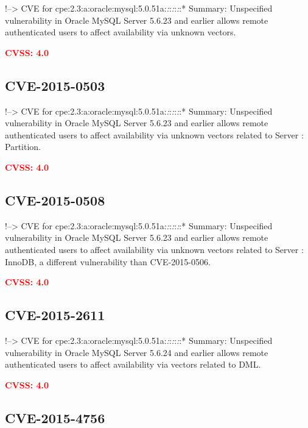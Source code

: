 \documentclass[a4paper, 12pt]{article}
\begin{document}
!--\textgreater{} CVE for
cpe:2.3:a:oracle:mysql:5.0.51a:\emph{:}:\emph{:}:\emph{:}:* Summary:
Unspecified vulnerability in Oracle MySQL Server 5.6.23 and earlier
allows remote authenticated users to affect availability via unknown
vectors.

\textbf{\textcolor{red}{CVSS: 4.0}}

\hypertarget{cve-2015-0503}{%
\subsection{CVE-2015-0503}\label{cve-2015-0503}}

!--\textgreater{} CVE for
cpe:2.3:a:oracle:mysql:5.0.51a:\emph{:}:\emph{:}:\emph{:}:* Summary:
Unspecified vulnerability in Oracle MySQL Server 5.6.23 and earlier
allows remote authenticated users to affect availability via unknown
vectors related to Server : Partition.

\textbf{\textcolor{red}{CVSS: 4.0}}

\hypertarget{cve-2015-0508}{%
\subsection{CVE-2015-0508}\label{cve-2015-0508}}

!--\textgreater{} CVE for
cpe:2.3:a:oracle:mysql:5.0.51a:\emph{:}:\emph{:}:\emph{:}:* Summary:
Unspecified vulnerability in Oracle MySQL Server 5.6.23 and earlier
allows remote authenticated users to affect availability via unknown
vectors related to Server : InnoDB, a different vulnerability than
CVE-2015-0506.

\textbf{\textcolor{red}{CVSS: 4.0}}

\hypertarget{cve-2015-2611}{%
\subsection{CVE-2015-2611}\label{cve-2015-2611}}

!--\textgreater{} CVE for
cpe:2.3:a:oracle:mysql:5.0.51a:\emph{:}:\emph{:}:\emph{:}:* Summary:
Unspecified vulnerability in Oracle MySQL Server 5.6.24 and earlier
allows remote authenticated users to affect availability via vectors
related to DML.

\textbf{\textcolor{red}{CVSS: 4.0}}

\hypertarget{cve-2015-4756}{%
\subsection{CVE-2015-4756}\label{cve-2015-4756}}
\end{document}
